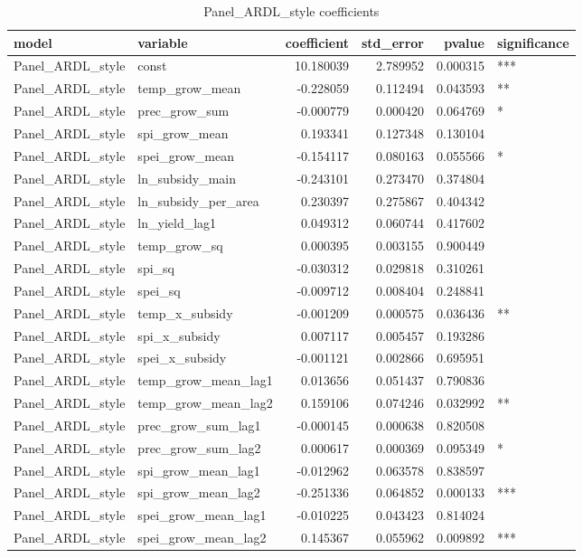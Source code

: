 \begin{table}
\caption{Panel_ARDL_style coefficients}
\label{tab:Panel_ARDL_style_coef}
\begin{tabular}{llrrrl}
\toprule
model & variable & coefficient & std_error & pvalue & significance \\
\midrule
Panel_ARDL_style & const & 10.180039 & 2.789952 & 0.000315 & *** \\
Panel_ARDL_style & temp_grow_mean & -0.228059 & 0.112494 & 0.043593 & ** \\
Panel_ARDL_style & prec_grow_sum & -0.000779 & 0.000420 & 0.064769 & * \\
Panel_ARDL_style & spi_grow_mean & 0.193341 & 0.127348 & 0.130104 &  \\
Panel_ARDL_style & spei_grow_mean & -0.154117 & 0.080163 & 0.055566 & * \\
Panel_ARDL_style & ln_subsidy_main & -0.243101 & 0.273470 & 0.374804 &  \\
Panel_ARDL_style & ln_subsidy_per_area & 0.230397 & 0.275867 & 0.404342 &  \\
Panel_ARDL_style & ln_yield_lag1 & 0.049312 & 0.060744 & 0.417602 &  \\
Panel_ARDL_style & temp_grow_sq & 0.000395 & 0.003155 & 0.900449 &  \\
Panel_ARDL_style & spi_sq & -0.030312 & 0.029818 & 0.310261 &  \\
Panel_ARDL_style & spei_sq & -0.009712 & 0.008404 & 0.248841 &  \\
Panel_ARDL_style & temp_x_subsidy & -0.001209 & 0.000575 & 0.036436 & ** \\
Panel_ARDL_style & spi_x_subsidy & 0.007117 & 0.005457 & 0.193286 &  \\
Panel_ARDL_style & spei_x_subsidy & -0.001121 & 0.002866 & 0.695951 &  \\
Panel_ARDL_style & temp_grow_mean_lag1 & 0.013656 & 0.051437 & 0.790836 &  \\
Panel_ARDL_style & temp_grow_mean_lag2 & 0.159106 & 0.074246 & 0.032992 & ** \\
Panel_ARDL_style & prec_grow_sum_lag1 & -0.000145 & 0.000638 & 0.820508 &  \\
Panel_ARDL_style & prec_grow_sum_lag2 & 0.000617 & 0.000369 & 0.095349 & * \\
Panel_ARDL_style & spi_grow_mean_lag1 & -0.012962 & 0.063578 & 0.838597 &  \\
Panel_ARDL_style & spi_grow_mean_lag2 & -0.251336 & 0.064852 & 0.000133 & *** \\
Panel_ARDL_style & spei_grow_mean_lag1 & -0.010225 & 0.043423 & 0.814024 &  \\
Panel_ARDL_style & spei_grow_mean_lag2 & 0.145367 & 0.055962 & 0.009892 & *** \\
\bottomrule
\end{tabular}
\end{table}
